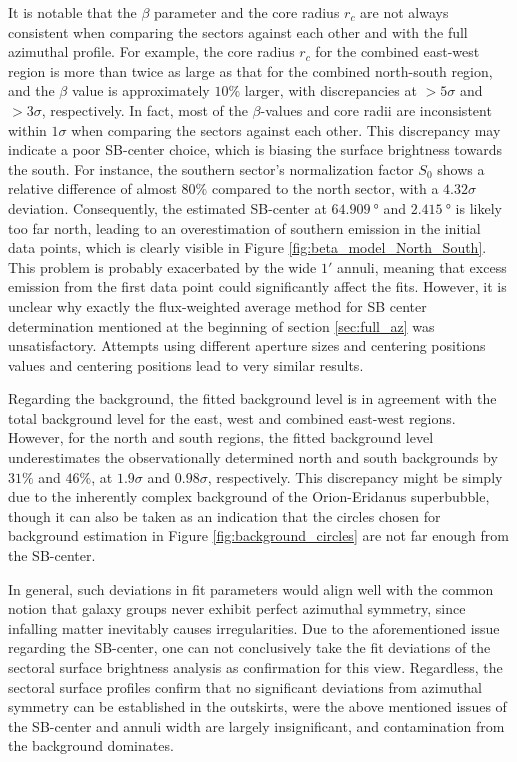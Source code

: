 It is notable that the \(\beta\) parameter and the core radius \(r_c\) are not always consistent when comparing the sectors against each other and with the full azimuthal profile. For example, the core radius \(r_c\) for the combined east-west region is more than twice as large as that for the combined north-south region, and the \(\beta\) value is approximately \(10\%\) larger, with discrepancies at \(> 5\sigma\) and \(> 3\sigma\), respectively. In fact, most of the \(\beta\)-values and core radii are inconsistent within \(1\sigma\) when comparing the sectors against each other. This discrepancy may indicate a poor SB-center choice, which is biasing the surface brightness towards the south. For instance, the southern sector's normalization factor \(S_0\) shows a relative difference of almost \(80\%\) compared to the north sector, with a \(4.32\sigma\) deviation. Consequently, the estimated SB-center at \(\SI{64.909}{\degree}\) and \(\SI{2.415}{\degree}\) is likely too far north, leading to an overestimation of southern emission in the initial data points, which is clearly visible in Figure \ref{fig:beta_model_North_South}. This problem is probably exacerbated by the wide \(1'\) annuli, meaning that excess emission from the first data point could significantly affect the fits. However, it is unclear why exactly the flux-weighted average method for SB center determination mentioned at the beginning of section \ref{sec:full_az} was unsatisfactory. Attempts using different aperture sizes and centering positions values and centering positions lead to very similar results.   

Regarding the background, the fitted background level is in agreement with the total background level for the east, west and combined east-west regions. However, for the north and south regions, the fitted background level underestimates the observationally determined north and south backgrounds by \(31\%\) and \(46\%\), at \(1.9\sigma\) and \(0.98\sigma\), respectively. This discrepancy might be simply due to the inherently complex background of the Orion-Eridanus superbubble, though it can also be taken as an indication that the circles chosen for background estimation in Figure \ref{fig:background_circles} are not far enough from the SB-center.

In general, such deviations in fit parameters would align well with the common notion that galaxy groups never exhibit perfect azimuthal symmetry, since infalling matter inevitably causes irregularities. Due to the aforementioned issue regarding the SB-center, one can not conclusively take the fit deviations of the sectoral surface brightness analysis as confirmation for this view. Regardless, the sectoral surface profiles confirm that no significant deviations from azimuthal symmetry can be established in the outskirts, were the above mentioned issues of the SB-center and annuli width are largely insignificant, and contamination from the background dominates.

